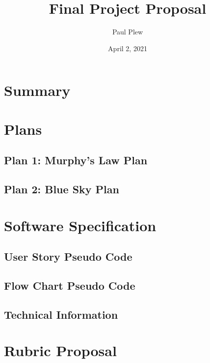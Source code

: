 \documentclass[12 pt]{report}
\title{Final Project Proposal}
\author{Paul Plew}
\date{April 2, 2021}
\begin{document}
\maketitle

\section{Summary}
\hspace{\parindent} 

\section{Plans}
\hspace{\parindent}

\subsection{Plan 1: Murphy's Law Plan}
\hspace{\parindent}

\subsection{Plan 2: Blue Sky Plan}
\hspace{\parindent}

\section{Software Specification}
\hspace{\parindent}
\subsection{User Story Pseudo Code}
\hspace{\parindent}

\subsection{Flow Chart Pseudo Code}
\hspace{\parindent}

\subsection{Technical Information}
\hspace{\parindent}

\section{Rubric Proposal}
\hspace{\parindent}
\end{document}
